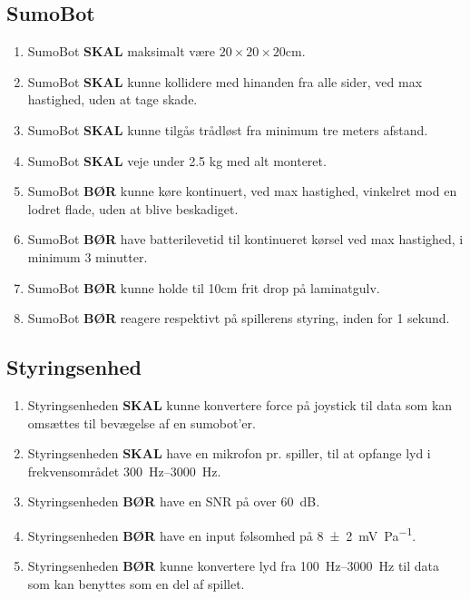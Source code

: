 \subsection{SumoBot}\label{sumobotkrav}
\begin{enumerate}
    \item SumoBot \textbf{SKAL} maksimalt være $20 \times 20 \times 20$cm.
    \item SumoBot \textbf{SKAL} kunne kollidere med hinanden fra alle sider, ved max hastighed, uden at tage skade.
    \item SumoBot \textbf{SKAL} kunne tilgås trådløst fra minimum tre meters afstand.
    \item SumoBot \textbf{SKAL} veje under 2.5 kg med alt monteret.
    \item SumoBot \textbf {BØR} kunne køre kontinuert, ved max hastighed, vinkelret mod en lodret flade, uden at blive beskadiget.
    \item SumoBot \textbf{BØR} have batterilevetid til kontinueret kørsel ved max hastighed, i minimum 3 minutter.
    \item SumoBot \textbf{BØR} kunne holde til 10cm frit drop på laminatgulv.
    \item SumoBot \textbf{BØR} reagere respektivt på spillerens styring, inden for 1 sekund.
\end{enumerate}


\subsection{Styringsenhed}
\begin{enumerate}
    \item Styringsenheden \textbf{SKAL} kunne konvertere force på joystick til data som kan omsættes til bevægelse af en \gls{sumobot}'er.
    \item Styringsenheden \textbf{SKAL} have en mikrofon pr. spiller, til at opfange lyd i frekvensområdet \SIrange{300}{3000}{\hertz}.
    \item Styringsenheden \textbf{BØR} have en \ac{SNR} på over \SI{60}{\dB}.
    \item Styringsenheden \textbf{BØR} have en input følsomhed på \SI{8(2)}{\milli\volt\per\pascal}.
    \item Styringsenheden \textbf{BØR} kunne konvertere lyd fra \SIrange{100}{3000}{\hertz} til data som kan benyttes som en del af spillet.
\end{enumerate}